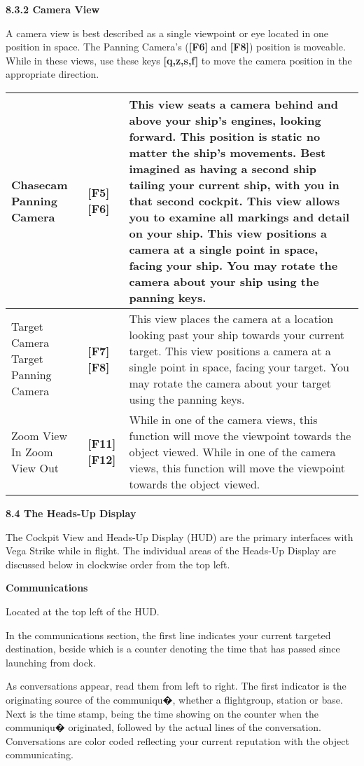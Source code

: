 \documentclass{article}
\begin{document}
\textbf{8.3.2 Camera View }

A camera view is best described as a single viewpoint or eye located in one position in space. The Panning Camera's (\textbf{[F6] }and \textbf{[F8]}) position is moveable. While in these views, use these keys \textbf{[q,z,s,f] }to move the camera position in the appropriate direction. 

\begin{tabular}{|p{0.6in}|p{0.4in}|p{3.9in}|} \hline 
Chasecam Panning Camera  & \textbf{[F5] [F6] } & This view seats a camera behind and above your ship's engines, looking forward. This position is static no matter the ship's movements. Best imagined as having a second ship tailing your current ship, with you in that second cockpit. This view allows you to examine all markings and detail on your ship. This view positions a camera at a single point in space, facing your ship. You may rotate the camera about your ship using the panning keys.  \\ \hline 
Target Camera Target Panning Camera  & \textbf{[F7] [F8] } & This view places the camera at a location looking past your ship towards your current target. This view positions a camera at a single point in space, facing your target. You may rotate the camera about your target using the panning keys.  \\ \hline 
Zoom View In Zoom View Out  & \textbf{[F11] [F12] } & While in one of the camera views, this function will move the viewpoint towards the object viewed. While in one of the camera views, this function will move the viewpoint towards the object viewed.  \\ \hline 
\end{tabular}



\textbf{8.4 The Heads-Up Display }

The Cockpit View and Heads-Up Display (HUD) are the primary interfaces with Vega Strike while in flight.  The individual areas of the Heads-Up Display are discussed below in clockwise order from the top left. 

\textbf{Communications }

Located at the top left of the HUD. 

In the communications section, the first line indicates your current targeted destination, beside which is a counter denoting the time that has passed since launching from dock. 

As conversations appear, read them from left to right. The first indicator is the originating source of the communiqu�, whether a flightgroup, station or base. Next is the time stamp, being the time showing on the counter when the communiqu� originated, followed by the actual lines of the conversation. Conversations are color coded reflecting your current reputation with the object communicating. 
\end{document}
